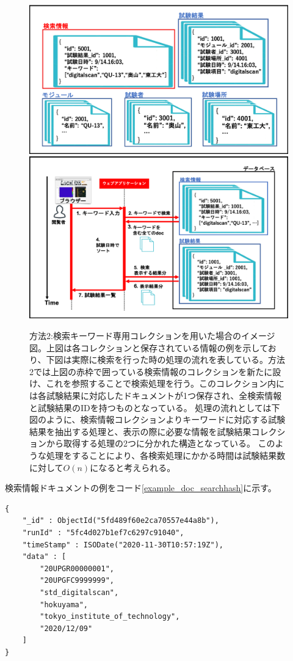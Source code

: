 \begin{figure}[bpt]
  \begin{center}
    \includegraphics[width=12cm]{./search_mongo_collection.png}
    \includegraphics[width=12cm]{./search_mongo_collection_flow.png}
  \caption[方法2:検索キーワード専用コレクションを用いた場合]
{方法2:検索キーワード専用コレクションを用いた場合のイメージ図。上図は各コレクションと保存されている情報の例を示しており、下図は実際に検索を行った時の処理の流れを表している。方法2では上図の赤枠で囲っている検索情報のコレクションを新たに設け、これを参照することで検索処理を行う。このコレクション内には各試験結果に対応したドキュメントが1つ保存され、全検索情報と試験結果のIDを持つものとなっている。
処理の流れとしては下図のように、検索情報コレクションよりキーワードに対応する試験結果を抽出する処理と、表示の際に必要な情報を試験結果コレクションから取得する処理の2つに分かれた構造となっている。
このような処理をすることにより、各検索処理にかかる時間は試験結果数に対して$O(n)$になると考えられる。}
  \label{search_mongo_collection}
  \end{center}
\end{figure}

検索情報ドキュメントの例をコード\ref{example_doc_searchhash}に示す。
\begin{lstlisting}[basicstyle=\scriptsize,caption=検索情報コレクションに入るドキュメントの例。このように試験結果のID(``runId")、試験日時(``timeStamp")、検索対象となる名前情報(``data")が保存される。,label=example_doc_searchhash]
{
	"_id" : ObjectId("5fd489f60e2ca70557e44a8b"),
	"runId" : "5fc4d027b1ef7c6297c91040",
	"timeStamp" : ISODate("2020-11-30T10:57:19Z"),
	"data" : [
		"20UPGR00000001",
		"20UPGFC9999999",
		"std_digitalscan",
		"hokuyama",
		"tokyo_institute_of_technology",
		"2020/12/09"
	]
}
\end{lstlisting}


